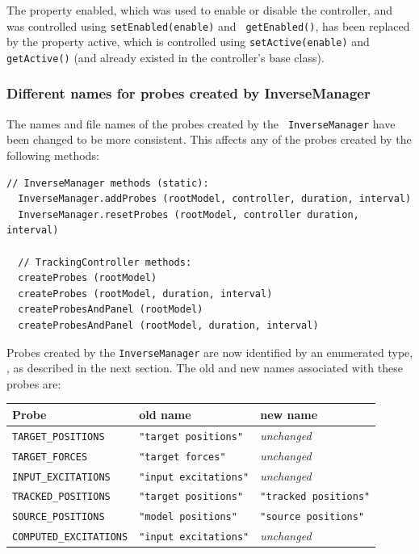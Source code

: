 \documentclass{article}
\begin{document}
The property {\sf enabled}, which was used to enable or disable the
controller, and was controlled using {\tt setEnabled(enable)} and {\tt
getEnabled()}, has been replaced by the property {\sf active}, which
is controlled using {\tt setActive(enable)} and {\tt getActive()} (and
already existed in the controller's base class).

\subsubsection*{Different names for probes created by InverseManager}

The names and file names of the probes created by the {\tt
InverseManager} have been changed to be more consistent. This affects
any of the probes created by the following methods:
%
\begin{lstlisting}[]
  // InverseManager methods (static):
  InverseManager.addProbes (rootModel, controller, duration, interval)
  InverseManager.resetProbes (rootModel, controller duration, interval)

  // TrackingController methods:
  createProbes (rootModel)
  createProbes (rootModel, duration, interval)
  createProbesAndPanel (rootModel)
  createProbesAndPanel (rootModel, duration, interval)
\end{lstlisting}
%
Probes created by the {\tt InverseManager} are now identified by an
enumerated type,
, as
described in the next section. The old and new names associated with
these probes are:
%
\begin{center}
\begin{tabular}{|lll|}
\hline
Probe & old name & new name \\
\hline
{\tt TARGET\_POSITIONS} & {\tt "target positions"} & {\it unchanged} \\
{\tt TARGET\_FORCES} & {\tt "target forces"} & {\it unchanged} \\
{\tt INPUT\_EXCITATIONS} & {\tt "input excitations"} & {\it unchanged} \\
{\tt TRACKED\_POSITIONS} & {\tt "target positions"} & {\tt "tracked positions"} \\
{\tt SOURCE\_POSITIONS} & {\tt "model positions"} & {\tt "source positions"} \\
{\tt COMPUTED\_EXCITATIONS} & {\tt "input excitations"} & {\it unchanged} \\
\hline
\end{tabular}
\end{center}
\end{document}
